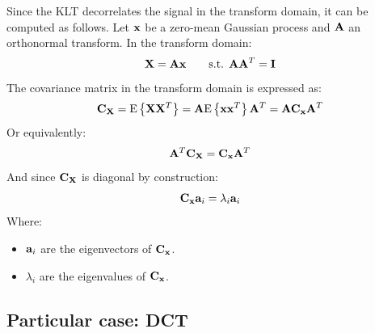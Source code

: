 \documentclass[11pt,a4paper,openright,twoside]{book}
\numberwithin{equation}{section} %
\begin{document}
Since the \ac{KLT} decorrelates the signal in the transform domain, it
can be computed as follows.
Let $\mathbf{x}$ be a zero-mean Gaussian process and $\mathbf{A}$ an orthonormal transform.
In the transform domain:
\begin{equation}
	\mathbf{X} = \mathbf{A} \mathbf{x} \qquad \text{s.t. } \mathbf{A} \mathbf{A}^T = \mathbf{I}
\end{equation}
The covariance matrix in the transform domain is expressed as:
\begin{equation}
	\mathbf{C}_{\mathbf{X}} = \text{E}\left\{\mathbf{X} \mathbf{X}^T\right\} = \mathbf{A} \text{E}\left\{\mathbf{x}\mathbf{x}^T\right\}\mathbf{A}^T =
	\mathbf{A}\mathbf{C}_{\mathbf{x}}\mathbf{A}^T
\end{equation}
Or equivalently:
\begin{equation}
	\mathbf{A}^T\mathbf{C}_{\mathbf{X}} = \mathbf{C}_{\mathbf{x}}\mathbf{A}^T
\end{equation}
And since $\mathbf{C}_{\mathbf{X}}$ is diagonal by construction:
\begin{equation}
	\mathbf{C}_{\mathbf{x}} \mathbf{a}_i = \lambda_i\mathbf{a}_i
\end{equation}
Where:
\begin{itemize}
	\item $\mathbf{a}_i$ are the eigenvectors of $\mathbf{C}_{\mathbf{x}}$.
	\item $\lambda_i$ are the eigenvalues of $\mathbf{C}_{\mathbf{x}}$.
\end{itemize}

\subsection{Particular case: \acs{DCT}}
\label{sub:particular_case_dct}
\end{document}
